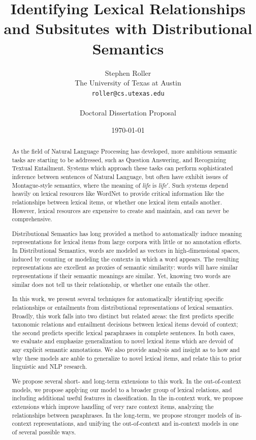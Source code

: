 \documentclass[letterpaper]{article}
\title{Identifying Lexical Relationships and Subsitutes with Distributional Semantics}
\author{Stephen Roller\\
The University of Texas at Austin\\
{\tt roller@cs.utexas.edu}\\
\\
Doctoral Dissertation Proposal}
\date{\today}
\begin{document}
\maketitle

\begin{abstract}
  As the field of Natural Language Processing has developed, more ambitious
  semantic tasks are starting to be addressed, such as Question Answering, and
  Recognizing Textual Entailment. Systems which approach these tasks can
  perform sophisticated inference between sentences of Natural Language, but
  often have exhibit issues of Montague-style semantics, where the meaning of
  {\em life} is {\em life$'$}. Such systems depend heavily on lexical resources
  like WordNet to provide critical information like the relationships between
  lexical items, or whether one lexical item entails another. However, lexical
  resources are expensive to create and maintain, and can never be
  comprehensive.

  Distributional Semantics has long provided a method to automatically induce
  meaning representations for lexical items from large corpora with little or
  no annotation efforts. In Distributional Semantics, words are modeled as
  vectors in high-dimensional spaces, induced by counting or modeling the
  contexts in which a word appears. The resulting representations are excellent
  as proxies of semantic similarity: words will have similar representations if
  their semantic meanings are similar. Yet, knowing two words are similar does
  not tell us their relationship, or whether one entails the other.

  In this work, we present several techniques for automatically identifying
  specific relationships or entailments from distributional representations of
  lexical semantics. Broadly, this work falls into two distinct but related
  areas: the first predicts specific taxonomic relations and entailment
  decisions between lexical items devoid of context;
  the second predicts specific lexical paraphrases in complete sentences. In
  both cases, we evaluate and emphasize generalization to novel lexical items
  which are devoid of any explicit semantic annotations.  We also provide
  analysis and insight as to how and why these models are anble to generalize
  to novel lexical items, and relate this to prior linguistic and NLP research.

  We propose several short- and long-term extensions to this work. In the
  out-of-context models, we propose applying our model to a broader group of
  lexical relations, and including additional useful features in
  classification.  In the in-context work, we propose extensions which improve
  handling of very rare context items, analyzing the relationships between
  paraphrases. In the long-term, we propose stronger models of in-context
  representations, and unifying the out-of-context and in-context models in
  one of several possible ways.
\end{abstract}
\end{document}
